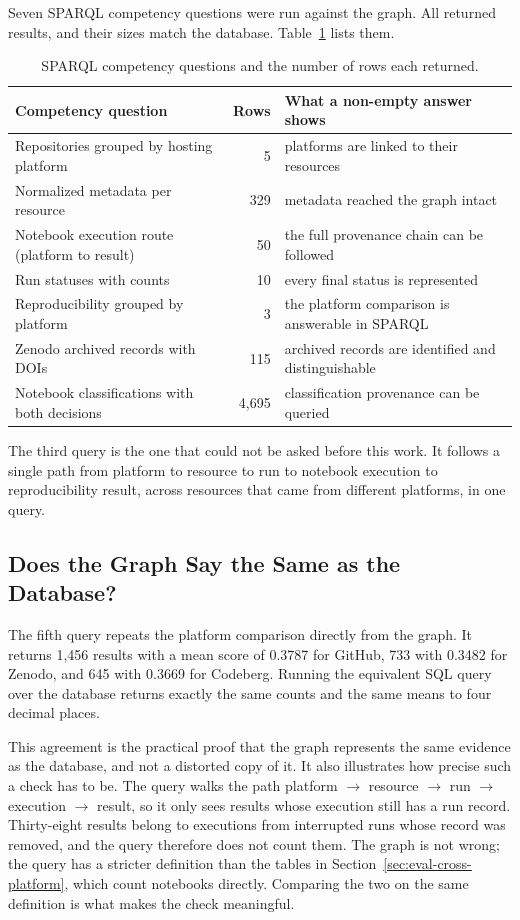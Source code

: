 Seven SPARQL competency questions were run against the graph. All returned results, and their sizes match the database. Table~\ref{tab:kg-queries} lists them.

\begin{table}[htbp]
\centering
\caption{SPARQL competency questions and the number of rows each returned.}
\label{tab:kg-queries}
\small
\begin{tabularx}{\textwidth}{@{}>{\raggedright\arraybackslash}p{5.8cm} r X@{}}
\toprule
Competency question & Rows & What a non-empty answer shows\tabularnewline
\midrule
Repositories grouped by hosting platform & 5 & platforms are linked to their resources\tabularnewline
Normalized metadata per resource & 329 & metadata reached the graph intact\tabularnewline
Notebook execution route (platform to result) & 50 & the full provenance chain can be followed\tabularnewline
Run statuses with counts & 10 & every final status is represented\tabularnewline
Reproducibility grouped by platform & 3 & the platform comparison is answerable in SPARQL\tabularnewline
Zenodo archived records with DOIs & 115 & archived records are identified and distinguishable\tabularnewline
Notebook classifications with both decisions & 4{,}695 & classification provenance can be queried\tabularnewline
\bottomrule
\end{tabularx}
\end{table}

The third query is the one that could not be asked before this work. It follows a single path from platform to resource to run to notebook execution to reproducibility result, across resources that came from different platforms, in one query.

\subsection{Does the Graph Say the Same as the Database?}

The fifth query repeats the platform comparison directly from the graph. It returns 1{,}456 results with a mean score of 0.3787 for GitHub, 733 with 0.3482 for Zenodo, and 645 with 0.3669 for Codeberg. Running the equivalent SQL query over the database returns exactly the same counts and the same means to four decimal places.

This agreement is the practical proof that the graph represents the same evidence as the database, and not a distorted copy of it. It also illustrates how precise such a check has to be. The query walks the path platform $\rightarrow$ resource $\rightarrow$ run $\rightarrow$ execution $\rightarrow$ result, so it only sees results whose execution still has a run record. Thirty-eight results belong to executions from interrupted runs whose record was removed, and the query therefore does not count them. The graph is not wrong; the query has a stricter definition than the tables in Section~\ref{sec:eval-cross-platform}, which count notebooks directly. Comparing the two on the same definition is what makes the check meaningful.

